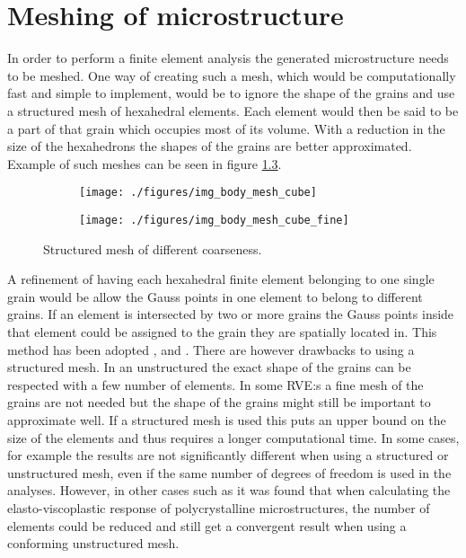 \documentclass[meshing_micro.tex]{subfiles}
\begin{document}
\FloatBarrier

\chapter{Meshing of microstructure}

In order to perform a finite element analysis the generated microstructure needs to be meshed. One way of creating such a mesh, which would be computationally fast and simple to implement, would be to ignore the shape of the grains and use a structured mesh of hexahedral elements. Each element would then be said to be a part of that grain which occupies most of its volume. With a reduction in the size of the hexahedrons the shapes of the grains are better approximated. Example of such meshes can be seen in figure \ref{fig:pois_voronoi_mesh_cube}.

\begin{figure}[htpb!]
\centering
\begin{subfigure}[b]{.5\textwidth}
  \centering
  \texttt{[image: ./figures/img\_body\_mesh\_cube]}
  \caption{}
  \label{fig:pois_voronoi_mesh_cube_a}
\end{subfigure}%
\begin{subfigure}[b]{.5\textwidth}
  \centering
  \texttt{[image: ./figures/img\_body\_mesh\_cube\_fine]}
  \caption{}
  \label{fig:pois_voronoi_mesh_cube_b}
\end{subfigure}
\caption{Structured mesh of different coarseness.}
\label{fig:pois_voronoi_mesh_cube}
\end{figure}

A refinement of having each hexahedral finite element belonging to one single grain would be allow the Gauss points in one element to belong to different grains. 
If an element is intersected by two or more grains the Gauss points inside that element could be assigned to the grain they are spatially located in. 
This method has been adopted \cite{Nygards20031049}, \cite{Cailletaud2003351} and \cite{Barbe2001513}. There are however drawbacks to using a structured mesh. 
In an unstructured the exact shape of the grains can be respected with a few number of elements. In some RVE:s a fine mesh of the grains are not needed but the shape of the grains might still be important to approximate well. If a structured mesh is used this puts an upper bound on the size of the elements and thus requires a longer computational time.
In some cases, for example \cite{Bohlke201011} the results are not significantly different when using a structured or unstructured mesh, even if the same number of degrees of freedom is used in the analyses. However, in other cases such as \cite{Li20091163} it was found that when calculating the elasto-viscoplastic response of polycrystalline microstructures, the number of elements could be reduced and still get a convergent result when using a conforming unstructured mesh. 
\end{document}
